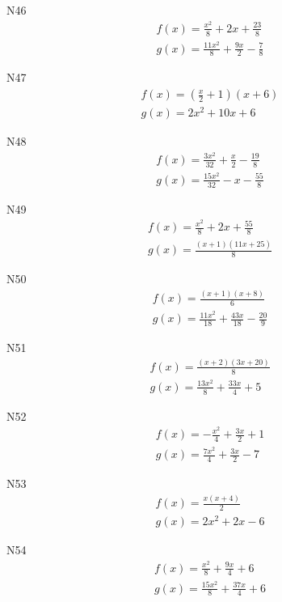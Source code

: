 \documentclass[11pt]{report}
\begin{document}
N46
\begin{align*}
 f(x) = \frac{x^{2}}{8} + 2 x + \frac{23}{8}\\
 g(x) = \frac{11 x^{2}}{8} + \frac{9 x}{2} - \frac{7}{8}
\end{align*}

N47
\begin{align*}
 f(x) = \left(\frac{x}{2} + 1\right) \left(x + 6\right)\\
 g(x) = 2 x^{2} + 10 x + 6
\end{align*}

N48
\begin{align*}
 f(x) = \frac{3 x^{2}}{32} + \frac{x}{2} - \frac{19}{8}\\
 g(x) = \frac{15 x^{2}}{32} - x - \frac{55}{8}
\end{align*}

N49
\begin{align*}
 f(x) = \frac{x^{2}}{8} + 2 x + \frac{55}{8}\\
 g(x) = \frac{\left(x + 1\right) \left(11 x + 25\right)}{8}
\end{align*}

N50
\begin{align*}
 f(x) = \frac{\left(x + 1\right) \left(x + 8\right)}{6}\\
 g(x) = \frac{11 x^{2}}{18} + \frac{43 x}{18} - \frac{20}{9}
\end{align*}

N51
\begin{align*}
 f(x) = \frac{\left(x + 2\right) \left(3 x + 20\right)}{8}\\
 g(x) = \frac{13 x^{2}}{8} + \frac{33 x}{4} + 5
\end{align*}

N52
\begin{align*}
 f(x) = - \frac{x^{2}}{4} + \frac{3 x}{2} + 1\\
 g(x) = \frac{7 x^{2}}{4} + \frac{3 x}{2} - 7
\end{align*}

N53
\begin{align*}
 f(x) = \frac{x \left(x + 4\right)}{2}\\
 g(x) = 2 x^{2} + 2 x - 6
\end{align*}

N54
\begin{align*}
 f(x) = \frac{x^{2}}{8} + \frac{9 x}{4} + 6\\
 g(x) = \frac{15 x^{2}}{8} + \frac{37 x}{4} + 6
\end{align*}
\end{document}
